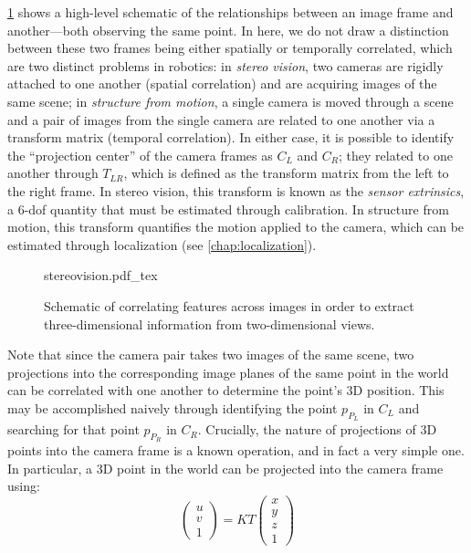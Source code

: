 \cref{fig:stereovision} shows a high-level schematic of the relationships between an image frame and another---both observing the same point. In here, we do not draw a distinction between these two frames being either spatially or temporally correlated, which are two distinct problems in robotics: in \textsl{stereo vision}, two cameras are rigidly attached to one another (spatial correlation) and are acquiring images of the same scene; in \textsl{structure from motion}, a single camera is moved through a scene and a pair of images from the single camera are related to one another via a transform matrix (temporal correlation).
In either case, it is possible to identify the ``projection center'' of the camera frames as $C_L$ and $C_R$; they related to one another through $T_{LR}$, which is defined as the transform matrix from the left to the right frame. In stereo vision, this transform is known as the \textsl{sensor extrinsics}, a 6-dof quantity that must be estimated through calibration. In structure from motion, this transform quantifies the motion applied to the camera, which can be estimated through localization (see \cref{chap:localization}).

\begin{figure}
\centering
    \def\svgwidth{1.0\textwidth} 
    {stereovision.pdf_tex}
\caption{Schematic of correlating features across images in order to extract three-dimensional information from two-dimensional views.}
\label{fig:stereovision}
\end{figure}

Note that since the camera pair takes two images of the same scene, two projections into the corresponding image planes of the same point in the world can be correlated with one another to determine the point's 3D position. This may be accomplished naively through identifying the point $p_{P_L}$ in $C_L$ and searching for that point $p_{P_R}$ in $C_R$. Crucially, the nature of projections of 3D points into the camera frame is a known operation, and in fact a very simple one. In particular, a 3D point in the world can be projected into the camera frame using:
\begin{equation}
\begin{pmatrix}
u\\
v\\
1
\end{pmatrix}
= K T \begin{pmatrix}
x\\
y\\
z\\
1 
\end{pmatrix}
\label{eq:stereovision}
\end{equation}

